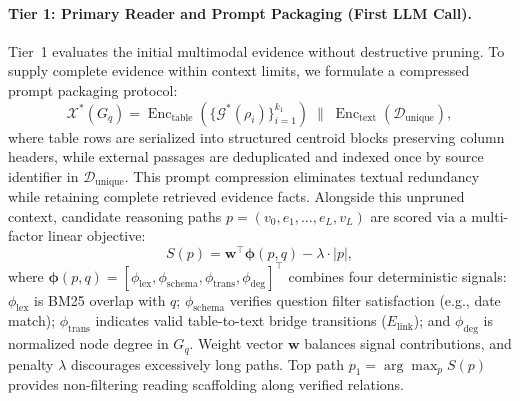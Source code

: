 \documentclass[runningheads]{llncs}
\begin{document}
\paragraph{Tier 1: Primary Reader and Prompt Packaging (First LLM Call).}
Tier~1 evaluates the initial multimodal evidence without destructive pruning. To supply complete evidence within context limits, we formulate a compressed prompt packaging protocol:
\begin{equation}
\label{eq:compression}
\mathcal{X}^*(G_q) = \operatorname{Enc}_{\text{table}}\left(\{\mathcal{G}^*(\rho_i)\}_{i=1}^{k_1}\right) \;\parallel\; \operatorname{Enc}_{\text{text}}(\mathcal{D}_{\text{unique}}),
\end{equation}
where table rows are serialized into structured centroid blocks preserving column headers, while external passages are deduplicated and indexed once by source identifier in $\mathcal{D}_{\text{unique}}$. This prompt compression eliminates textual redundancy while retaining complete retrieved evidence facts. Alongside this unpruned context, candidate reasoning paths $p = (v_0, e_1, \dots, e_L, v_L)$ are scored via a multi-factor linear objective:
\begin{equation}
\label{eq:path-score}
S(p) = \mathbf{w}^\top \boldsymbol{\phi}(p, q) - \lambda \cdot |p|,
\end{equation}
where $\boldsymbol{\phi}(p, q) = [\phi_{\text{lex}}, \phi_{\text{schema}}, \phi_{\text{trans}}, \phi_{\text{deg}}]^\top$ combines four deterministic signals: $\phi_{\text{lex}}$ is BM25 overlap with $q$; $\phi_{\text{schema}}$ verifies question filter satisfaction (e.g., date match); $\phi_{\text{trans}}$ indicates valid table-to-text bridge transitions ($E_{\text{link}}$); and $\phi_{\text{deg}}$ is normalized node degree in $G_q$. Weight vector $\mathbf{w}$ balances signal contributions, and penalty $\lambda$ discourages excessively long paths. Top path $p_1 = \arg\max_{p} S(p)$ provides non-filtering reading scaffolding along verified relations.
\end{document}
